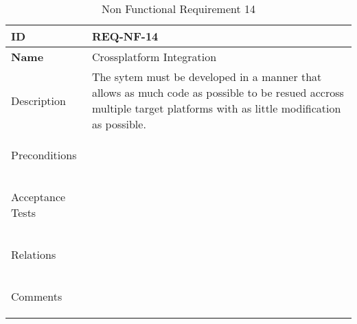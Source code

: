 \begin{table}[H]
    \begin{tabular}[t]{ | >{\bfseries}l | p{9.5cm} |}

    \hline
    ID
    &  REQ-NF-14 \\ \hline

    Name
    & Crossplatform Integration \\ \hline

    Description
    & The sytem must be developed in a manner that allows as much code as possible to be resued accross multiple target platforms with as little modification as possible. \\ \hline

    Preconditions
    &  \\ \hline

    Acceptance Tests
    & \\ \hline

    Relations
    &  \\ \hline

    Comments
    &  \\ \hline

    \end{tabular}

    \caption{Non Functional Requirement 14}
    \label{fig:req_nf_14}

\end{table}